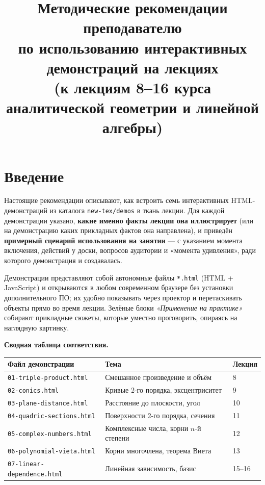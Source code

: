 \documentclass[12pt,a4paper]{article}
\title{Методические рекомендации преподавателю\\
  по использованию интерактивных демонстраций на лекциях\\
\large (к лекциям 8--16 курса аналитической геометрии и линейной алгебры)}
\author{}
\date{}
\begin{document}
\maketitle
\thispagestyle{fancy}

\section*{Введение}

Настоящие рекомендации описывают, как встроить семь интерактивных
HTML-демонстраций из каталога \texttt{new-tex/demos} в ткань лекции.
Для каждой демонстрации указано, \textbf{какие именно факты лекции она
иллюстрирует} (или на демонстрацию каких прикладных фактов она направлена),
и приведён \textbf{примерный сценарий использования на занятии} — с указанием
момента включения, действий у доски, вопросов аудитории и «момента удивления»,
ради которого демонстрация и создавалась.

Демонстрации представляют собой автономные файлы \texttt{*.html}
(HTML + JavaScript)
и открываются в любом современном браузере без установки дополнительного ПО;
их удобно показывать через проектор и перетаскивать объекты прямо во время
лекции. Зелёные блоки \emph{«Применение на практике»} собирают прикладные
сюжеты, которые уместно проговорить, опираясь на наглядную картинку.

\medskip
\noindent\textbf{Сводная таблица соответствия.}
\begin{center}
  \renewcommand{\arraystretch}{1.3}
  \begin{tabular}{@{}p{}p{}p{}@{}}
    \hline
    \textbf{Файл демонстрации} & \textbf{Тема} & \textbf{Лекция}\\
    \hline
    \texttt{01-triple-product.html}   & Смешанное произведение и
    объём          & 8\\
    \texttt{02-conics.html}           & Кривые 2-го порядка,
    эксцентриситет     & 9\\
    \texttt{03-plane-distance.html}   & Расстояние до плоскости, угол
    & 10\\
    \texttt{04-quadric-sections.html} & Поверхности 2-го порядка,
    сечения       & 11\\
    \texttt{05-complex-numbers.html}  & Комплексные числа, корни
    $n$-й степени  & 12\\
    \texttt{06-polynomial-vieta.html} & Корни многочлена, теорема
    Виета         & 13\\
    \texttt{07-linear-dependence.html}& Линейная зависимость, базис
    & 15--16\\
    \hline
  \end{tabular}
\end{center}

\bigskip


\bigskip

\bigskip

\bigskip

\bigskip

\bigskip

\bigskip

\end{document}
